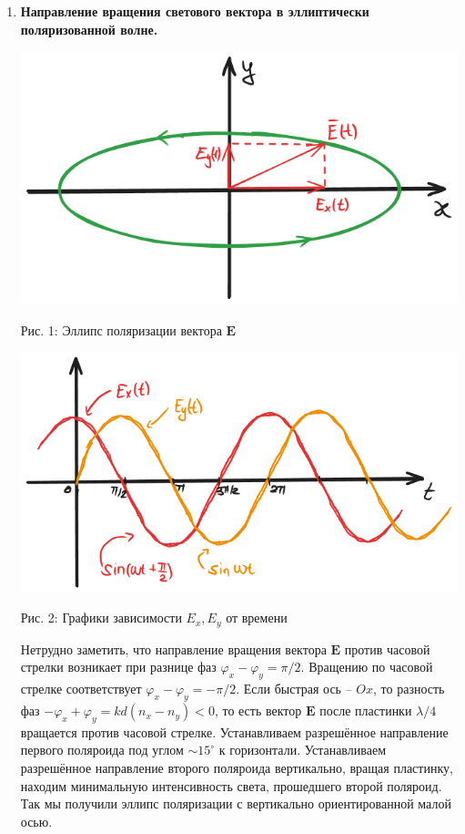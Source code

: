 \documentclass[12pt]{article}
\begin{document}
\begin{enumerate}
        \item \textbf{Направление вращения светового вектора в эллиптически
        поляризованной волне.}

        \begin{minipage}[h!]{0.48\linewidth}
            \includegraphics[width=\linewidth]{pic/elips}
            \caption{Рис. 1: Эллипс поляризации вектора $\textbf{E}$}
        \end{minipage}
        \hfill
        \begin{minipage}[h!]{0.48\linewidth}
            \includegraphics[width=\linewidth]{pic/sin}
            \caption{Рис. 2: Графики зависимости $E_x, E_y$ от времени}
        \end{minipage}

        Нетрудно заметить, что направление вращения вектора $\textbf{E}$ против часовой стрелки возникает
        при разнице фаз $\varphi_x - \varphi_y = \pi/2$.
        Вращению по часовой стрелке соответствует $\varphi_x - \varphi_y = -\pi/2$.
        Если быстрая ось -- $Ox$, то разность фаз $-\varphi_x + \varphi_y = kd(n_x - n_y) < 0$,
        то есть вектор $\textbf{E}$ после пластинки $\lambda/4$ вращается против часовой стрелке.
        Устанавливаем разрешённое направление первого поляроида под углом $\sim 15^{\circ}$ к горизонтали.
        Устанавливаем разрешённое направление второго поляроида вертикально, вращая пластинку,
        находим минимальную интенсивность света, прошедшего второй поляроид.
        Так мы получили эллипс поляризации с вертикально ориентированной малой осью.


\end{enumerate}
\end{document}
